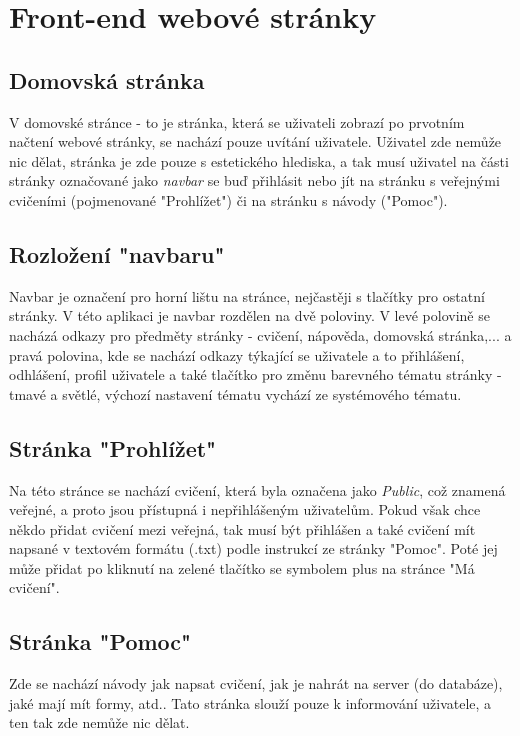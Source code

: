 \documentclass[12pt]{report}
\begin{document}
\chapter{Front-end webové stránky}
\section{Domovská stránka}
V domovské stránce - to je stránka, která se uživateli zobrazí po prvotním načtení webové stránky, se nachází pouze uvítání uživatele. Uživatel zde nemůže nic dělat, stránka je zde pouze s estetického hlediska, a tak musí uživatel na části stránky označované jako \emph{navbar} se buď přihlásit nebo jít na stránku s veřejnými cvičeními (pojmenované "Prohlížet") či na stránku s návody ("Pomoc").

\section{Rozložení "navbaru"}
Navbar je označení pro horní lištu na stránce, nejčastěji s tlačítky pro ostatní stránky. V této aplikaci je navbar rozdělen na dvě poloviny. V levé polovině se nacházá odkazy pro předměty stránky - cvičení, nápověda, domovská stránka,... a pravá polovina, kde se nachází odkazy týkající se uživatele a to přihlášení, odhlášení, profil uživatele a také tlačítko pro změnu barevného tématu stránky - tmavé a světlé,  výchozí nastavení tématu vychází ze systémového tématu.

\section{Stránka "Prohlížet"}
Na této stránce se nachází cvičení, která byla označena jako \emph{Public}, což znamená veřejné, a proto jsou přístupná i nepřihlášeným uživatelům. Pokud však chce někdo přidat cvičení mezi veřejná, tak musí být přihlášen a také cvičení mít napsané v textovém formátu (.txt) podle instrukcí ze stránky "Pomoc". Poté jej může přidat po kliknutí na zelené tlačítko se symbolem plus na stránce "Má cvičení".

\section{Stránka "Pomoc"}
Zde se nachází návody jak napsat cvičení, jak je nahrát na server (do databáze), jaké mají mít formy, atd.. Tato stránka slouží pouze k informování uživatele, a ten tak zde nemůže nic dělat.
\end{document}
